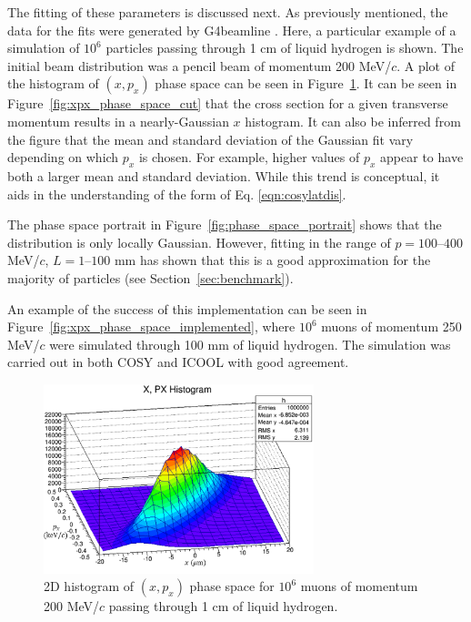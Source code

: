 The fitting of these parameters is discussed next. As previously mentioned, the data for the fits were generated by G4beamline \cite{g4bl}. Here, a particular example of a simulation of $10^6$ particles passing through 1 cm of liquid hydrogen is shown. The initial beam distribution was a pencil beam of momentum 200 MeV/$c$. A plot of the histogram of $(x,p_x)$ phase space can be seen in Figure~\ref{fig:xpx_phase_space}. It can be seen in Figure~\ref{fig:xpx_phase_space_cut} that the cross section for a given transverse momentum results in a nearly-Gaussian $x$ histogram. It can also be inferred from the figure that the mean and standard deviation of the Gaussian fit vary depending on which $p_x$ is chosen. For example, higher values of $p_x$ appear to have both a larger mean and standard deviation. While this trend is conceptual, it aids in the understanding of the form of Eq. \eqref{eqn:cosylatdis}.

The phase space portrait in Figure~\ref{fig:phase_space_portrait} shows that the distribution is only locally Gaussian. However, fitting in the range of $p=100\text{--}400$ MeV/$c$, $L=1\text{--}100$ mm has shown that this is a good approximation for the majority of particles (see Section~\ref{sec:benchmark}).

An example of the success of this implementation can be seen in Figure~\ref{fig:xpx_phase_space_implemented}, where $10^6$ muons of momentum 250 MeV/$c$ were simulated through 100 mm of liquid hydrogen. The simulation was carried out in both COSY and ICOOL \cite{icool} with good agreement.

\begin{figure}[H]
  \centering
    \includegraphics[width=0.7\textwidth]{Figures/xpx_phase_space} 
  \caption[2D histogram of $(x,p_x)$ phase space.]{2D histogram of $(x,p_x)$ phase space for $10^6$ muons of momentum 200 MeV/$c$ passing through 1 cm of liquid hydrogen.}
  \label{fig:xpx_phase_space}
\end{figure}

